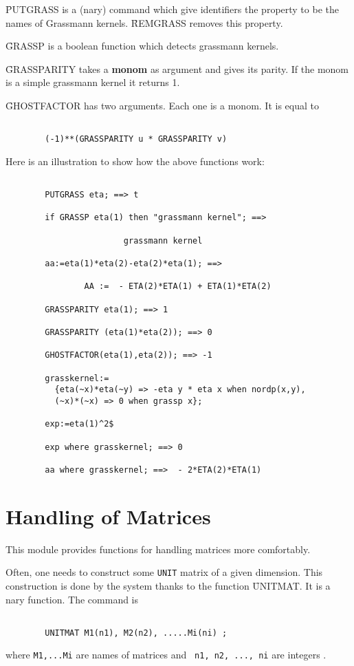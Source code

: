 \f{PUTGRASS} is a (nary) command which give identifiers the property
to be the names of Grassmann kernels. \f{REMGRASS} removes this property.

\f{GRASSP} is a boolean function which detects grassmann kernels.

\f{GRASSPARITY} takes a {\bf monom}  as argument and gives its parity.
If the monom is a simple grassmann kernel it returns 1.

\f{GHOSTFACTOR} has two arguments. Each one is a monom. It is equal to
\begin{verbatim}

        (-1)**(GRASSPARITY u * GRASSPARITY v)

\end{verbatim}
Here is an illustration to show how the above functions work:
\begin{verbatim}

        PUTGRASS eta; ==> t

        if GRASSP eta(1) then "grassmann kernel"; ==>

                        grassmann kernel

        aa:=eta(1)*eta(2)-eta(2)*eta(1); ==>

                AA :=  - ETA(2)*ETA(1) + ETA(1)*ETA(2)

        GRASSPARITY eta(1); ==> 1

        GRASSPARITY (eta(1)*eta(2)); ==> 0

        GHOSTFACTOR(eta(1),eta(2)); ==> -1

        grasskernel:=
          {eta(~x)*eta(~y) => -eta y * eta x when nordp(x,y),
          (~x)*(~x) => 0 when grassp x};

        exp:=eta(1)^2$

        exp where grasskernel; ==> 0

        aa where grasskernel; ==>  - 2*ETA(2)*ETA(1)

\end{verbatim}
\section{Handling of Matrices}
This module provides functions for handling matrices more comfortably.
\bi
\item[i.]
Often, one needs to construct some {\tt UNIT} matrix of
a given dimension. This construction is done by the system thanks
to the function \f{UNITMAT}. It is a nary function. The command is
\begin{verbatim}

        UNITMAT M1(n1), M2(n2), .....Mi(ni) ;

\end{verbatim}
where \verb+M1,...Mi+ are names of matrices and
\verb+ n1, n2, ..., ni+ are integers .


